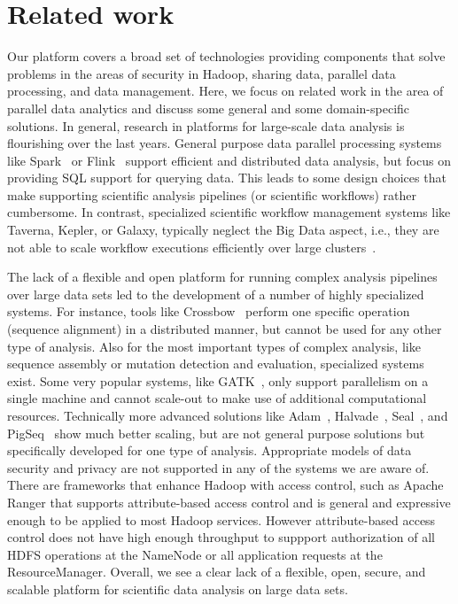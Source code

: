 \section{Related work}

Our platform covers a broad set of technologies providing components that solve problems in the areas of security in Hadoop, sharing data, parallel data processing, and data management. Here, we focus on related work in the area of parallel data analytics and discuss some general and some domain-specific solutions. In general, research in platforms for large-scale data analysis is flourishing over the last years. General purpose data parallel processing systems like Spark~\cite{Zaharia2010} or Flink~\cite{flink15} support efficient and distributed data analysis, but focus on providing SQL support for querying data. This leads to some design choices that make supporting scientific analysis pipelines (or scientific workflows) rather cumbersome. In contrast, specialized scientific workflow management systems like Taverna, Kepler, or Galaxy, typically neglect the Big Data aspect, i.e., they are not able to scale workflow executions efficiently over large clusters~\cite{Bux2013}. 

The lack of a flexible and open platform for running complex analysis pipelines over large data sets led to the development of a number of highly specialized systems. For instance, tools like Crossbow~\cite{Langmead2009b} perform one specific operation (sequence alignment) in a distributed manner, but cannot be used for any other type of analysis. Also for the most important types of complex analysis, like sequence assembly or mutation detection and evaluation, specialized systems exist. Some very popular systems, like GATK~\cite{McKenna2010}, only support parallelism on a single machine and cannot scale-out to make use of additional computational resources. Technically more advanced solutions like Adam~\cite{adam15}, Halvade~\cite{halvade15}, Seal~\cite{seal11}, and PigSeq~\cite{seqpig14} show much better scaling, but are not general purpose solutions but specifically developed for one type of analysis. Appropriate models of data security and privacy are not supported in any of the systems we are aware of. There are frameworks that enhance Hadoop with access control, such as Apache Ranger that supports attribute-based access control and is general and expressive enough to be applied to most Hadoop services. However attribute-based access control does not have high enough throughput to suppport authorization of all HDFS operations at the NameNode or all application requests at the ResourceManager. Overall, we see a clear lack of a flexible, open, secure, and scalable platform for scientific data analysis on large data sets.
